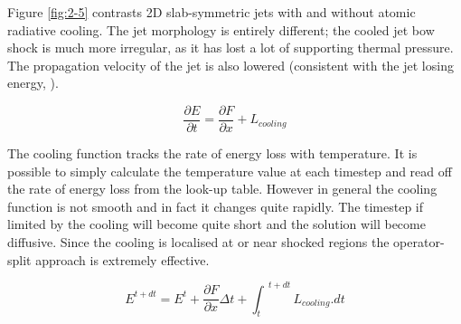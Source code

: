 Figure \ref{fig:2-5} contrasts 2D slab-symmetric jets with and without atomic radiative cooling.
The jet morphology is entirely different; the cooled jet bow shock is much more irregular, as it has lost a lot of supporting thermal pressure.
The propagation velocity of the jet is also lowered (consistent with the jet
losing energy, \citet{1990ApJ...360..370B}).

\begin{equation}
\frac{\partial E}{\partial t}
=
\frac{\partial F}{\partial x}
+
L_{cooling}
\end{equation}

The cooling function tracks the rate of energy loss with temperature.
It is possible to simply calculate the temperature value at each timestep and read off the rate of energy loss from the look-up table.
However in general the cooling function is not smooth and in fact it changes quite rapidly.
The timestep if limited by the cooling will become quite short and the solution will become diffusive.
Since the cooling is localised at or near shocked regions the operator-split approach is extremely effective.

\begin{equation}
E^{t+dt}
=
E^t
+
\frac{\partial F}{\partial x} \Delta t
+
{\int_{t}}^{t+dt} L_{cooling}.dt
\end{equation}



